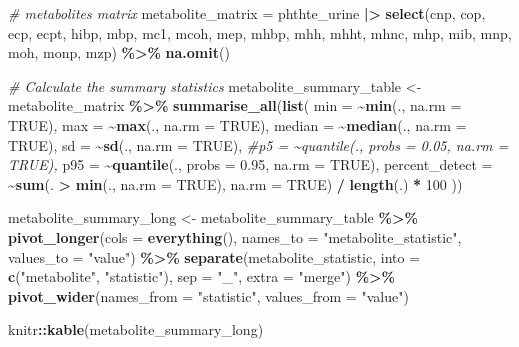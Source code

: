 \documentclass[
]{article}
\newenvironment{Shaded}{\begin{snugshade}}{\end{snugshade}}
\newcommand{\AttributeTok}[1]{\textcolor[rgb]{0.13,0.29,0.53}{#1}}
\newcommand{\CommentTok}[1]{\textcolor[rgb]{0.56,0.35,0.01}{\textit{#1}}}
\newcommand{\ConstantTok}[1]{\textcolor[rgb]{0.56,0.35,0.01}{#1}}
\newcommand{\DecValTok}[1]{\textcolor[rgb]{0.00,0.00,0.81}{#1}}
\newcommand{\FloatTok}[1]{\textcolor[rgb]{0.00,0.00,0.81}{#1}}
\newcommand{\FunctionTok}[1]{\textcolor[rgb]{0.13,0.29,0.53}{\textbf{#1}}}
\newcommand{\NormalTok}[1]{#1}
\newcommand{\OtherTok}[1]{\textcolor[rgb]{0.56,0.35,0.01}{#1}}
\newcommand{\SpecialCharTok}[1]{\textcolor[rgb]{0.81,0.36,0.00}{\textbf{#1}}}
\newcommand{\StringTok}[1]{\textcolor[rgb]{0.31,0.60,0.02}{#1}}
\begin{document}
\begin{Shaded}
\begin{Highlighting}[]
\CommentTok{\# metabolites matrix }
\NormalTok{metabolite\_matrix }\OtherTok{=}\NormalTok{ phthte\_urine }\SpecialCharTok{|\textgreater{}} 
  \FunctionTok{select}\NormalTok{(cnp, cop, ecp, ecpt, hibp, mbp, mc1, mcoh, mep, mhbp, mhh, mhht, mhnc, mhp, mib, mnp, moh, monp, mzp) }\SpecialCharTok{\%\textgreater{}\%} 
  \FunctionTok{na.omit}\NormalTok{()}

\CommentTok{\# Calculate the summary statistics}
\NormalTok{metabolite\_summary\_table }\OtherTok{\textless{}{-}}\NormalTok{ metabolite\_matrix }\SpecialCharTok{\%\textgreater{}\%} \FunctionTok{summarise\_all}\NormalTok{(}\FunctionTok{list}\NormalTok{(}
  \AttributeTok{min =} \SpecialCharTok{\textasciitilde{}}\FunctionTok{min}\NormalTok{(., }\AttributeTok{na.rm =} \ConstantTok{TRUE}\NormalTok{),}
  \AttributeTok{max =} \SpecialCharTok{\textasciitilde{}}\FunctionTok{max}\NormalTok{(., }\AttributeTok{na.rm =} \ConstantTok{TRUE}\NormalTok{), }
  \AttributeTok{median =} \SpecialCharTok{\textasciitilde{}}\FunctionTok{median}\NormalTok{(., }\AttributeTok{na.rm =} \ConstantTok{TRUE}\NormalTok{),}
  \AttributeTok{sd =} \SpecialCharTok{\textasciitilde{}}\FunctionTok{sd}\NormalTok{(., }\AttributeTok{na.rm =} \ConstantTok{TRUE}\NormalTok{),}
  \CommentTok{\#p5 = \textasciitilde{}quantile(., probs = 0.05, na.rm = TRUE),}
  \AttributeTok{p95 =} \SpecialCharTok{\textasciitilde{}}\FunctionTok{quantile}\NormalTok{(., }\AttributeTok{probs =} \FloatTok{0.95}\NormalTok{, }\AttributeTok{na.rm =} \ConstantTok{TRUE}\NormalTok{),}
  \AttributeTok{percent\_detect =} \SpecialCharTok{\textasciitilde{}}\FunctionTok{sum}\NormalTok{(. }\SpecialCharTok{\textgreater{}} \FunctionTok{min}\NormalTok{(., }\AttributeTok{na.rm =} \ConstantTok{TRUE}\NormalTok{), }\AttributeTok{na.rm =} \ConstantTok{TRUE}\NormalTok{) }\SpecialCharTok{/} \FunctionTok{length}\NormalTok{(.) }\SpecialCharTok{*} \DecValTok{100}
\NormalTok{))}

\NormalTok{metabolite\_summary\_long }\OtherTok{\textless{}{-}}\NormalTok{ metabolite\_summary\_table }\SpecialCharTok{\%\textgreater{}\%}
  \FunctionTok{pivot\_longer}\NormalTok{(}\AttributeTok{cols =} \FunctionTok{everything}\NormalTok{(),}
               \AttributeTok{names\_to =} \StringTok{"metabolite\_statistic"}\NormalTok{,}
               \AttributeTok{values\_to =} \StringTok{"value"}\NormalTok{) }\SpecialCharTok{\%\textgreater{}\%}
  \FunctionTok{separate}\NormalTok{(metabolite\_statistic, }\AttributeTok{into =} \FunctionTok{c}\NormalTok{(}\StringTok{"metabolite"}\NormalTok{, }\StringTok{"statistic"}\NormalTok{), }\AttributeTok{sep =} \StringTok{"\_"}\NormalTok{, }\AttributeTok{extra =} \StringTok{"merge"}\NormalTok{) }\SpecialCharTok{\%\textgreater{}\%}
  \FunctionTok{pivot\_wider}\NormalTok{(}\AttributeTok{names\_from =} \StringTok{"statistic"}\NormalTok{, }\AttributeTok{values\_from =} \StringTok{"value"}\NormalTok{)}

\NormalTok{knitr}\SpecialCharTok{::}\FunctionTok{kable}\NormalTok{(metabolite\_summary\_long)}
\end{Highlighting}
\end{Shaded}
\end{document}
